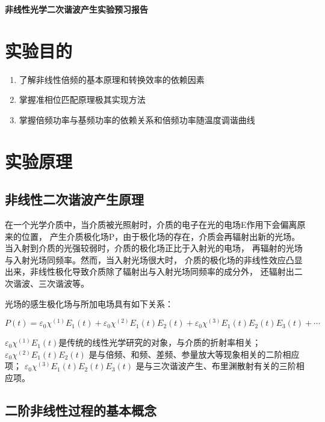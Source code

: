 \documentclass[a4paper,UTF8]{ctexart}
\begin{document}
\begin{center}
    \textbf{\Large 非线性光学二次谐波产生实验预习报告}
    \par {}
\end{center}

\section{实验目的}

\begin{enumerate}
    \item 了解非线性倍频的基本原理和转换效率的依赖因素
    \item 掌握准相位匹配原理极其实现方法
    \item 掌握倍频功率与基频功率的依赖关系和倍频功率随温度调谐曲线
\end{enumerate}

\section{实验原理}

\subsection{非线性二次谐波产生原理}

在一个光学介质中，当介质被光照射时，介质的电子在光的电场E作用下会偏离原来的位置，
产生介质极化场P，由于极化场的存在，介质会再辐射出新的光场。
当入射到介质的光强较弱时，介质的极化场正比于入射光的电场，
再辐射的光场与入射光场同频率。然而，当入射光场很大时，
介质的极化场的非线性效应凸显出来，非线性极化导致介质除了辐射出与入射光场同频率的成分外，
还辐射出二次谐波、三次谐波等。

光场的感生极化场与所加电场具有如下关系：

\begin{equation}
    P(t) = \varepsilon_0\chi^{(1)}E_1(t) + \varepsilon_0\chi^{(2)}E_1(t)E_2(t) + \varepsilon_0\chi^{(3)}E_1(t)E_2(t)E_3(t) + \cdots
\end{equation}

$\varepsilon_0\chi^{(1)}E_1(t)$是传统的线性光学研究的对象，与介质的折射率相关； 
$\varepsilon_0\chi^{(2)}E_1(t)E_2(t)$ 是与倍频、和频、差频、参量放大等现象相关的二阶相应项；
$\varepsilon_0\chi^{(3)}E_1(t)E_2(t)E_3(t)$ 是与三次谐波产生、布里渊散射有关的三阶相应项。

\subsection{二阶非线性过程的基本概念}
\end{document}
